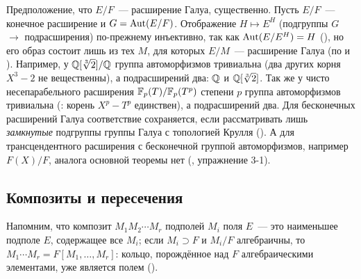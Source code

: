 \begin{remark}[3.17c]
Предположение, что $E/F$~--- расширение Галуа, существенно. Пусть $E/F$~--- конечное расширение и $G=\operatorname{Aut}(E/F)$.
Отображение $H\mapsto E^H$ (подгруппы $G$ $\to$ подрасширения) по-прежнему инъективно, так как $\operatorname{Aut}(E/E^H)=H$ (), но
его образ состоит лишь из тех $M$, для которых $E/M$~--- расширение Галуа (по  и ). Например, у
$\mathbb Q[\sqrt[3]2]/\mathbb Q$ группа автоморфизмов тривиальна (два других корня $X^3-2$ не вещественны), а подрасширений два: $\mathbb Q$ и
$\mathbb Q[\sqrt[3]2]$. Так же у чисто несепарабельного расширения $\mathbb F_p(T)/\mathbb F_p(T^p)$ степени $p$ группа автоморфизмов тривиальна
(: корень $X^p-T^p$ единствен), а подрасширений два. Для бесконечных расширений Галуа соответствие сохраняется, если
рассматривать лишь \emph{замкнутые} подгруппы группы Галуа с топологией Крулля (). А для трансцендентного
расширения с бесконечной группой автоморфизмов, например $F(X)/F$, аналога основной теоремы нет (,
упражнение 3-1).
\end{remark}

\subsection*{Композиты и пересечения}

Напомним, что композит $M_1M_2\cdots M_r$ подполей $M_i$ поля $E$~--- это наименьшее подполе $E$, содержащее все $M_i$; если
$M_i\supset F$ и $M_i/F$ алгебраичны, то $M_1\cdots M_r=F[M_1,\dots,M_r]$: кольцо, порождённое над $F$ алгебраическими
элементами, уже является полем ().

